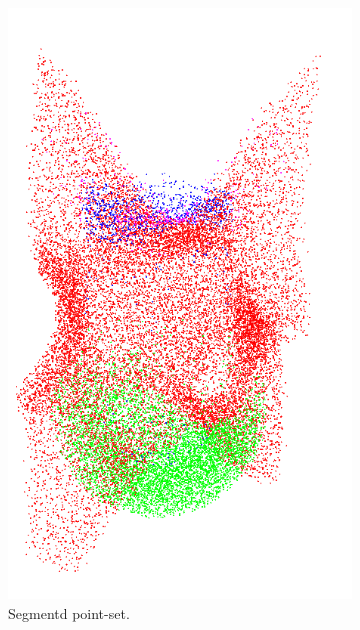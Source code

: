\begin{figure}
	\centering
	\begin{subfigure}[b]{0.20\linewidth}
		\centering
		\includegraphics[width=\textwidth]{figures/m1_pc.png}
		\caption{Segmentd point-set.}
	\end{subfigure}	 
	\begin{subfigure}[b]{0.25\linewidth}
		\centering

\end{subfigure}
\end{figure}
